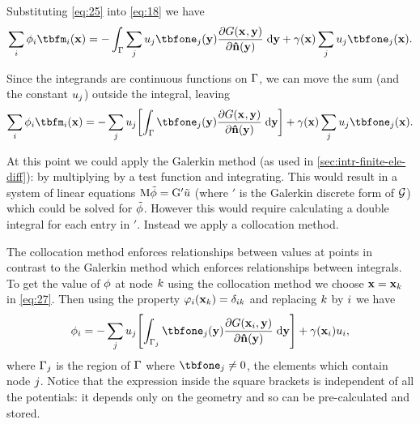 Substituting \cref{eq:25} into \cref{eq:18} we have
\begin{equation}
  \sum_\ibasis \phim_{\ibasis} \tbfm_{\ibasis}(\xv) =
  - \int_{\boundd} \sum_\ibasisb \phione_{\ibasisb} \tbfone_{\ibasisb}(\yv)
  \pd{\Green}{\nv(\yv)} \d \yv
   + \gamma(\xv) \sum_\ibasisb \phione_{\ibasisb} \tbfone_{\ibasisb}(\xv).
\end{equation}

Since the integrands are continuous functions on ${\Gamma}$, we can move the sum (and the constant $u_{{j}}$) outside the integral, leaving
\begin{equation}
  \sum_\ibasis \phim_{\ibasis} \tbfm_{\ibasis}(\xv) =
  - \sum_\ibasisb  \phione_{\ibasisb}  \bigs{\int_{\boundd} \tbfone_{\ibasisb}(\yv)
    \pd{\Green}{\nv(\yv)} \d \yv }
  + \gamma(\xv) \sum_\ibasisb \phione_{\ibasisb} \tbfone_{\ibasisb}(\xv).
  \label{eq:27}
\end{equation}

At this point we could apply the Galerkin method (as used in \cref{sec:intr-finite-ele-diff}): by multiplying by a test function and integrating.
This would result in a system of linear equations $\mathrm{M} \tilde{\phi} = {\mathbf{\mathrm{G}}}' \tilde{u}$ (where $\bm'$ is the Galerkin discrete form of $\mathcal{G}$) which could be solved for $\tilde{\phi}$.
However this would require calculating a double integral for each entry in $\bm'$.
Instead we apply a collocation method.

The collocation method enforces relationships between values at points in contrast to the Galerkin method which enforces relationships between integrals.
To get the value of $\phi$ at node ${k}$ using the collocation method we choose $\mathbf{x} = \mathbf{x}_{k}$ in \cref{eq:27}.
Then using the property $\varphi_{i}(\mathbf{x}_{k}) = \delta_{{i} {k}}$ and replacing ${k}$ by ${i}$ we have
\begin{equation}
  \phim_{\ibasis} =
  - \sum_\ibasisb \phione_{\ibasisb}  \bigs{\int_{\boundd_\ibasisb} \tbfone_{\ibasisb}(\yv)
  \pd{\Green[\ibasis]}{\nv(\yv)} \d \yv}
   + \gamma(\xv_\ibasis) \phione_{\ibasis},
  \label{eq:colocation}
\end{equation}
where ${{\Gamma}_{j}}$ is the region of ${\Gamma}$ where $\tbfone_{\ibasisb} \neq 0$, \ie the elements which contain node ${j}$.
Notice that the expression inside the square brackets is independent of all the potentials: it depends only on the geometry and so can be pre-calculated and stored.



